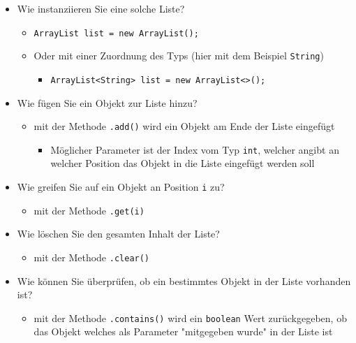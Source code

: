 \documentclass[a4paper,10pt, dvipsnames]{report}
\begin{document}
\begin{itemize}
    \item Wie instanziieren Sie eine solche Liste?
    \begin{itemize}
        \item \texttt{ArrayList list = new ArrayList();}
        \item Oder mit einer Zuordnung des Typs (hier mit dem Beispiel \texttt{String})
        \begin{itemize}
            \item \texttt{ArrayList<String> list = new ArrayList<>();}
        \end{itemize}
    \end{itemize}
    \item Wie fügen Sie ein Objekt zur Liste hinzu?
    \begin{itemize}
        \item mit der Methode \texttt{.add()} wird ein Objekt am Ende der Liste eingefügt
        \begin{itemize}
            \item Möglicher Parameter ist der Index vom Typ \texttt{int}, welcher angibt an welcher Position das Objekt in die Liste eingefügt werden soll
        \end{itemize}
    \end{itemize}
    \item Wie greifen Sie auf ein Objekt an Position \texttt{i} zu?
    \begin{itemize}
        \item mit der Methode \texttt{.get(i)}
    \end{itemize}
    \item Wie löschen Sie den gesamten Inhalt der Liste?
    \begin{itemize}
        \item mit der Methode \texttt{.clear()}
    \end{itemize}
    \item Wie können Sie überprüfen, ob ein bestimmtes Objekt in der Liste vorhanden ist?
    \begin{itemize}
        \item mit der Methode \texttt{.contains()} wird ein \texttt{boolean} Wert zurückgegeben, ob das Objekt welches als Parameter "mitgegeben wurde" in der Liste ist
    \end{itemize}
\end{itemize}
\end{document}
